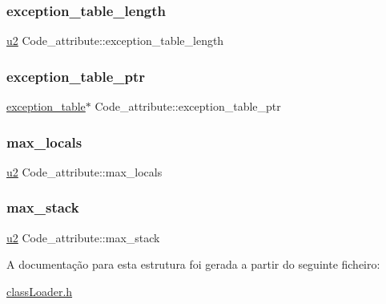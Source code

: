 \subsubsection{\texorpdfstring{exception\+\_\+table\+\_\+length}{exception\_table\_length}}
{\footnotesize\ttfamily \hyperlink{util_8h_a55ef8d87fd202b8417704c089899c5b9}{u2} Code\+\_\+attribute\+::exception\+\_\+table\+\_\+length}

\mbox{\label{struct_code__attribute_af5c8031eb2ccf44c7684e4cb02169f14}} 
\subsubsection{\texorpdfstring{exception\+\_\+table\+\_\+ptr}{exception\_table\_ptr}}
{\footnotesize\ttfamily \hyperlink{structexception__table}{exception\+\_\+table}$\ast$ Code\+\_\+attribute\+::exception\+\_\+table\+\_\+ptr}

\mbox{\label{struct_code__attribute_ad710ec86a1d37c6daa999383f8f2fd35}} 
\subsubsection{\texorpdfstring{max\+\_\+locals}{max\_locals}}
{\footnotesize\ttfamily \hyperlink{util_8h_a55ef8d87fd202b8417704c089899c5b9}{u2} Code\+\_\+attribute\+::max\+\_\+locals}

\mbox{\label{struct_code__attribute_a300885ff1326f01f7c86e7b4425f0d35}} 
\subsubsection{\texorpdfstring{max\+\_\+stack}{max\_stack}}
{\footnotesize\ttfamily \hyperlink{util_8h_a55ef8d87fd202b8417704c089899c5b9}{u2} Code\+\_\+attribute\+::max\+\_\+stack}



A documentação para esta estrutura foi gerada a partir do seguinte ficheiro\+:\begin{DoxyCompactItemize}
\item 
\hyperlink{class_loader_8h}{class\+Loader.\+h}\end{DoxyCompactItemize}

